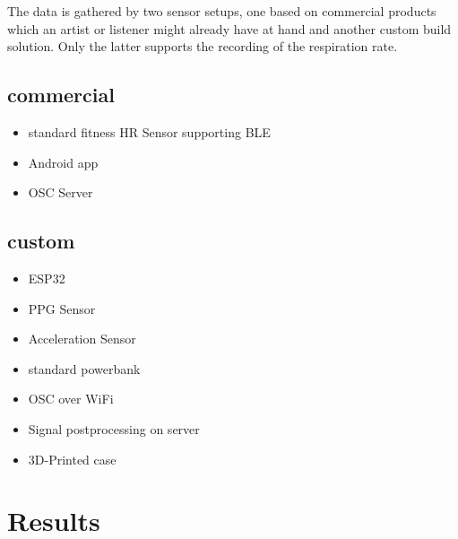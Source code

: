 \documentclass{sigchi-ext}
\begin{document}
The data is gathered by two sensor setups, one based on commercial products which an artist or
listener might already have at hand and another custom build solution. Only the latter supports
the recording of the respiration rate.

\subsection{commercial}
\begin{itemize}
  \item standard fitness HR Sensor supporting BLE
  \item Android app
  \item OSC Server
\end{itemize}

\subsection{custom}
\begin{itemize}
  \item ESP32
  \item PPG Sensor
  \item Acceleration Sensor
  \item standard powerbank
  \item OSC over WiFi
  \item Signal postprocessing on server
  \item 3D-Printed case
\end{itemize}

\section{Results}



\balance{} 



\end{document}
